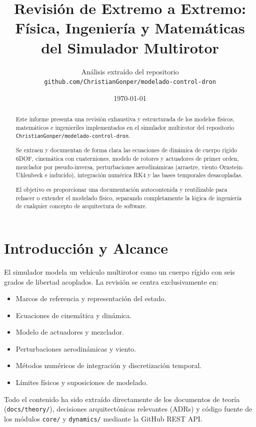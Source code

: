 \documentclass[12pt,a4paper]{article}
\title{\textbf{Revisión de Extremo a Extremo:\\Física, Ingeniería y Matemáticas del Simulador Multirotor}}
\author{Análisis extraído del repositorio\\ \texttt{github.com/ChristianGonper/modelado-control-dron}}
\date{\today}
\begin{document}
\maketitle

\begin{abstract}
Este informe presenta una revisión exhaustiva y estructurada de los modelos físicos, matemáticos e ingenieriles implementados en el simulador multirotor del repositorio \texttt{ChristianGonper/modelado-control-dron}. 

Se extraen y documentan de forma clara las ecuaciones de dinámica de cuerpo rígido 6DOF, cinemática con cuaterniones, modelo de rotores y actuadores de primer orden, mezclador por pseudo-inversa, perturbaciones aerodinámicas (arrastre, viento Ornstein-Uhlenbeck e inducido), integración numérica RK4 y las bases temporales desacopladas. 

El objetivo es proporcionar una documentación autocontenida y reutilizable para rehacer o extender el modelado físico, separando completamente la lógica de ingeniería de cualquier concepto de arquitectura de software.
\end{abstract}

\newpage
\tableofcontents
\newpage

\section{Introducción y Alcance}

El simulador modela un vehículo multirotor como un cuerpo rígido con seis grados de libertad acoplados. La revisión se centra exclusivamente en:

\begin{itemize}
    \item Marcos de referencia y representación del estado.
    \item Ecuaciones de cinemática y dinámica.
    \item Modelo de actuadores y mezclador.
    \item Perturbaciones aerodinámicas y viento.
    \item Métodos numéricos de integración y discretización temporal.
    \item Límites físicos y suposiciones de modelado.
\end{itemize}

Todo el contenido ha sido extraído directamente de los documentos de teoría (\texttt{docs/theory/}), decisiones arquitectónicas relevantes (ADRs) y código fuente de los módulos \texttt{core/} y \texttt{dynamics/} mediante la GitHub REST API.
\end{document}

